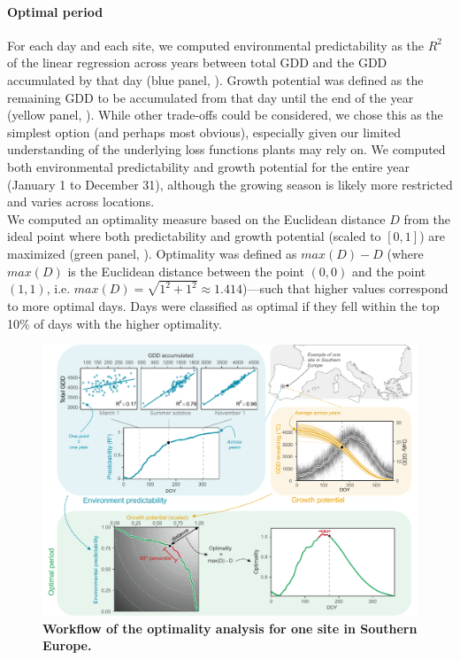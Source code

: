 \documentclass[11pt,letter]{article}
\begin{document}
\paragraph{Optimal period} For each day and each site, we computed environmental predictability as the $R^2$ of the linear regression across years between total GDD and the GDD accumulated by that day (blue panel, ). Growth potential was defined as the remaining GDD to be accumulated from that day until the end of the year (yellow panel, ). While other trade-offs could be considered, we chose this as the simplest option (and perhaps most obvious), especially given our limited understanding of the underlying loss functions plants may rely on. We computed both environmental predictability and growth potential for the entire year (January 1 to December 31), although the growing season is likely more restricted and varies across locations. \\
We computed an optimality measure based on the Euclidean distance $D$ from  the ideal point where both predictability and growth potential (scaled to $[0,1]$) are maximized (green panel, ). Optimality was defined as $max(D)-D$ (where $max(D)$ is the Euclidean distance between the point $(0,0)$ and the point $(1,1)$, i.e. $max(D)=\sqrt{1^2+1^2}\approx1.414$)---such that higher values correspond to more optimal days. Days were classified as optimal if they fell within the top 10\% of days with the higher optimality.



\begin{figure}[hb]
\hspace*{-1.4cm}
\includegraphics{method_figure.pdf}
\vspace*{-0.4cm}
\caption{\textbf{Workflow of the optimality analysis for one site in Southern Europe.}} %
\label{fig:method}
\end{figure}
\end{document}
